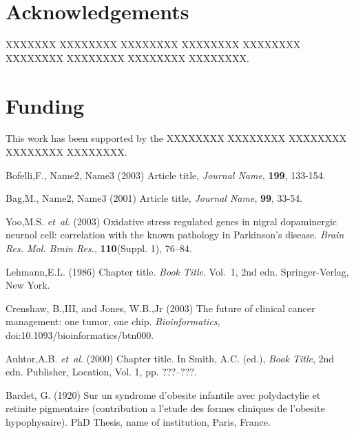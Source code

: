 \documentclass{bioinfo}
\begin{document}
    \section*{Acknowledgements}
    XXXXXXX XXXXXXXX XXXXXXXX XXXXXXXX XXXXXXXX XXXXXXXX XXXXXXXX XXXXXXXX XXXXXXXX.


    \section*{Funding}
    This work has been supported by the XXXXXXXX XXXXXXXX XXXXXXXX XXXXXXXX XXXXXXXX.

%
%
%
%
%
%
%
%
%


    \begin{thebibliography}{}

        Bofelli,F., Name2, Name3 (2003) Article title, {\it Journal Name}, {\bf 199}, 133-154.

        Bag,M., Name2, Name3 (2001) Article title, {\it Journal Name}, {\bf 99}, 33-54.

        Yoo,M.S. \textit{et~al}. (2003) Oxidative stress regulated genes
        in nigral dopaminergic neurnol cell: correlation with the known
        pathology in Parkinson's disease. \textit{Brain Res. Mol. Brain
        Res.}, \textbf{110}(Suppl. 1), 76--84.

        Lehmann,E.L. (1986) Chapter title. \textit{Book Title}. Vol.~1, 2nd edn. Springer-Verlag, New York.

        Crenshaw, B.,III, and Jones, W.B.,Jr (2003) The future of clinical
        cancer management: one tumor, one chip. \textit{Bioinformatics},
        doi:10.1093/bioinformatics/btn000.

        Auhtor,A.B. \textit{et~al}. (2000) Chapter title. In Smith, A.C.
        (ed.), \textit{Book Title}, 2nd edn. Publisher, Location, Vol. 1, pp.
        ???--???.

        Bardet, G. (1920) Sur un syndrome d'obesite infantile avec
        polydactylie et retinite pigmentaire (contribution a l'etude des
        formes cliniques de l'obesite hypophysaire). PhD Thesis, name of
        institution, Paris, France.

    \end{thebibliography}
\end{document}
